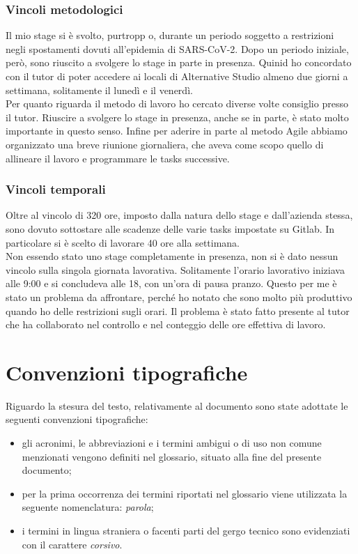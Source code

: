 \subsubsection{Vincoli metodologici}
Il mio stage si è svolto, purtropp o, durante un periodo soggetto a restrizioni negli spostamenti dovuti all'epidemia di SARS-CoV-2. Dopo un
periodo iniziale, però, sono riuscito a svolgere lo stage in parte in presenza. Quinid ho concordato con il tutor di poter accedere ai locali di
Alternative Studio almeno due giorni a settimana, solitamente il lunedì e il venerdì. \\
Per quanto riguarda il metodo di lavoro ho cercato diverse volte consiglio presso il tutor. Riuscire a svolgere lo stage in presenza, anche
se in parte, è stato molto importante in questo senso. Infine per aderire in parte al metodo \gls{Agile} abbiamo organizzato una breve riunione
giornaliera, che aveva come scopo quello di allineare il lavoro e programmare le tasks successive.

\subsubsection{Vincoli temporali}
Oltre al vincolo di 320 ore, imposto dalla natura dello stage e dall'azienda stessa, sono dovuto sottostare alle scadenze delle varie tasks
impostate su Gitlab. In particolare si è scelto di lavorare 40 ore alla settimana. \\
Non essendo stato  uno stage completamente in presenza, non si è dato nessun vincolo sulla singola giornata lavorativa. Solitamente l'orario
lavorativo iniziava alle 9:00 e si concludeva alle 18, con un'ora di pausa pranzo. Questo per me è stato un problema da affrontare, perché
ho notato che sono molto più produttivo quando ho delle restrizioni sugli orari. Il problema è stato fatto presente al tutor che ha
collaborato nel controllo e nel conteggio delle ore effettiva di lavoro.


\section{Convenzioni tipografiche}

Riguardo la stesura del testo, relativamente al documento sono state adottate le seguenti convenzioni tipografiche:
\begin{itemize}
	\item gli acronimi, le abbreviazioni e i termini ambigui o di uso non comune menzionati vengono definiti nel glossario, situato alla fine del presente documento;
	\item per la prima occorrenza dei termini riportati nel glossario viene utilizzata la seguente nomenclatura: \emph{parola}\glsfirstoccur;
	\item i termini in lingua straniera o facenti parti del gergo tecnico sono evidenziati con il carattere \emph{corsivo}.
\end{itemize}

